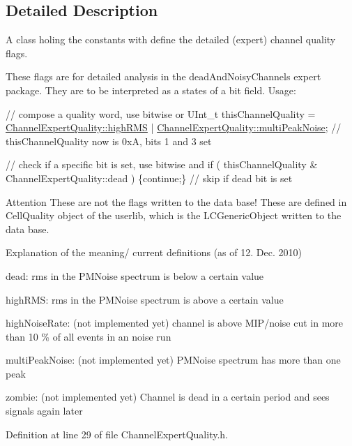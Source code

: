 \subsection{Detailed Description}
A class holing the constants with define the detailed (expert) channel quality flags. 

These flags are for detailed analysis in the dead\-And\-Noisy\-Channels expert package. They are to be interpreted as a states of a bit field. Usage\-: 
\begin{DoxyCode}
\textcolor{comment}{// compose a quality word, use bitwise or}
UInt\_t thisChannelQuality = \hyperlink{class_channel_expert_quality_a0b17164b19cdc8619c1a93fe1728c4c3}{ChannelExpertQuality::highRMS} | 
      \hyperlink{class_channel_expert_quality_a13046f6e61373f907a79326530ee2e07}{ChannelExpertQuality::multiPeakNoise};
\textcolor{comment}{// thisChannelQuality now is 0xA, bits 1 and 3 set}

\textcolor{comment}{// check if a specific bit is set, use bitwise and}
\textcolor{keywordflow}{if} ( thisChannelQuality & ChannelExpertQuality::dead ) \{\textcolor{keywordflow}{continue};\} \textcolor{comment}{// skip if dead bit is set}
\end{DoxyCode}


\begin{DoxyAttention}{Attention}
These are not the flags written to the data base! These are defined in Cell\-Quality object of the userlib, which is the L\-C\-Generic\-Object written to the data base.
\end{DoxyAttention}
Explanation of the meaning/ current definitions (as of 12. Dec. 2010) \begin{DoxyItemize}
\item {\ttfamily dead\-:} rms in the P\-M\-Noise spectrum is below a certain value \item {\ttfamily high\-R\-M\-S\-:} rms in the P\-M\-Noise spectrum is above a certain value \item {\ttfamily high\-Noise\-Rate\-:} (not implemented yet) channel is above M\-I\-P/noise cut in more than 10 \% of all events in an noise run \item {\ttfamily multi\-Peak\-Noise\-:} (not implemented yet) P\-M\-Noise spectrum has more than one peak \item {\ttfamily zombie\-:} (not implemented yet) Channel is dead in a certain period and sees signals again later \end{DoxyItemize}


Definition at line 29 of file Channel\-Expert\-Quality.\-h.



